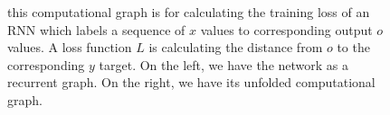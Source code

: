 \begin{figure}[h]
\begin{tikzpicture}
  \end{tikzpicture}
  \caption{this computational graph is for calculating the training loss of an
    RNN which labels a sequence of $x$ values to corresponding output $o$
    values. A loss function $L$ is calculating the distance from $o$ to the
    corresponding $y$ target. On the left, we have the network as a recurrent
  graph. On the right, we have its unfolded computational
graph.~\cite{Goodfellow-et-al-2016}}
  \label{noutputrnn}
\end{figure}
